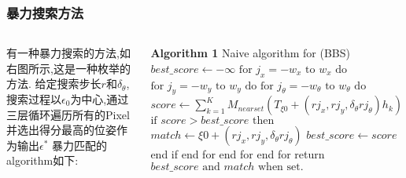 \begin{frame}[fragile]
\frametitle{暴力搜索方法}

\begin{columns}
		有一种暴力搜索的方法,如右图所示,这是一种枚举的方法.
		给定搜索步长$r$和$\delta_\theta$,搜索过程以$\epsilon_0$为中心,通过三层循环遍历所有的Pixel并选出得分最高的位姿作为输出$\epsilon^*$
暴力匹配的algorithm如下:
\begin{algorithmic}[1]
\State \textbf{Algorithm 1} Naive algorithm for (BBS)
\State $best\_score \leftarrow - \infty$
\State $\text{for } j_x = -w_x \text{ to } w_x \text{ do}$
\State \quad $\text{for } j_y = -w_y \text{ to } w_y \text{ do}$
\State \qquad $\text{for } j_\theta = -w_\theta \text{ to } w_\theta \text{ do}$
\State \qquad \quad $score \leftarrow \sum_{k=1}^K M_{nearset} (T_{\xi 0}+(rj_x,rj_y,\delta_\theta rj_\theta)h_k)$
\State \qquad \quad $\text{if } score > best\_score \text{ then}$
\State \qquad \qquad $match \leftarrow \xi 0 + (rj_x,rj_y,\delta_\theta rj_\theta)$
\State \qquad \qquad $best\_score \leftarrow score$
\State \qquad \quad end if
\State \qquad end for
\State \quad end for
\State end for
\State return $best\_score \text{ and } match \text{ when set.}$
\end{algorithmic}
\end{columns}

\end{frame}

